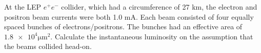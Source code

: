 
\begin{problem}{1.11}
At the LEP $e^+e^-$ collider, which had a circumference of 27 km, the electron and positron beam currents were both 1.0 mA. Each beam consisted of four equally spaced bunches of electrons/positrons. The bunches had an effective area of $\num{1.8e4}\unit{\micro\metre^2}$.
Calculate the instantaneous luminosity on the assumption that the beams collided head-on.
\end{problem}
\begin{solution}

\end{solution}